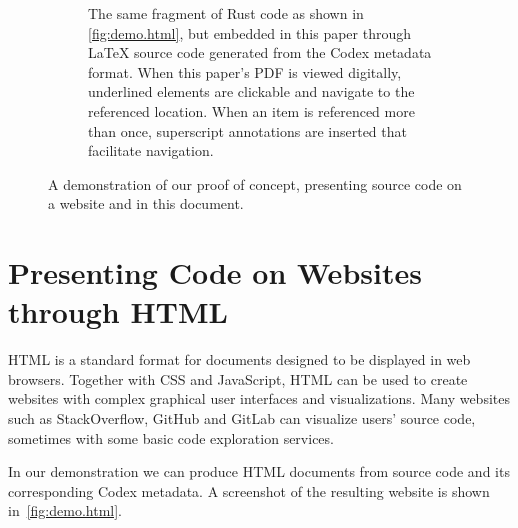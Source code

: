 \begin{figure}[ht]
\begin{subfigure}[b]{0.49\textwidth}
    \end{subfigure}
    \hfill
    \begin{subfigure}[b]{0.49\textwidth}
        \centering
        \codeNumberRs
        \caption{
            The same fragment of Rust code as shown in \cref{fig:demo.html},
            but embedded in this paper through LaTeX source code generated from the Codex metadata format.
            When this paper's \acs{PDF} is viewed digitally, underlined elements are clickable and navigate to the referenced location.
            When an item is referenced more than once, superscript annotations are inserted that facilitate navigation. \\
        }%
        \label{fig:demo.latex}
    \end{subfigure}
    \caption{A demonstration of our proof of concept, presenting source code on a website and in this document.}
    \label{fig:demo}
\end{figure}

%


\section{Presenting Code on Websites through HTML}
\label{sec:demonstration.html}

HTML is a standard format for documents designed to be displayed in web browsers.
Together with CSS and JavaScript, HTML can be used to create websites with complex graphical user interfaces and visualizations.
Many websites such as StackOverflow, GitHub and GitLab can visualize users' source code, sometimes with some basic code exploration services.

In our demonstration we can produce HTML documents from source code and its corresponding Codex metadata.
A screenshot of the resulting website is shown in~\cref{fig:demo.html}.

